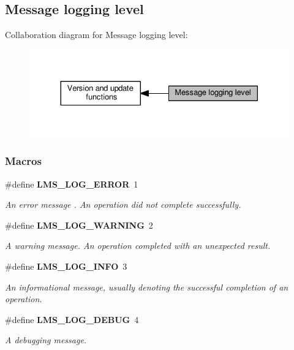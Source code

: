 \subsection{Message logging level}
\label{group__LMS__LOG__LEVEL}
Collaboration diagram for Message logging level\+:
\nopagebreak
\begin{figure}[H]
\begin{center}
\leavevmode
\includegraphics[width=330pt]{d2/d60/group__LMS__LOG__LEVEL}
\end{center}
\end{figure}
\subsubsection*{Macros}
\begin{DoxyCompactItemize}
\item 
\#define {\bf L\+M\+S\+\_\+\+L\+O\+G\+\_\+\+E\+R\+R\+OR}~1
\begin{DoxyCompactList}\small\item\em An error message . An operation did not complete successfully. \end{DoxyCompactList}\item 
\#define {\bf L\+M\+S\+\_\+\+L\+O\+G\+\_\+\+W\+A\+R\+N\+I\+NG}~2
\begin{DoxyCompactList}\small\item\em A warning message. An operation completed with an unexpected result. \end{DoxyCompactList}\item 
\#define {\bf L\+M\+S\+\_\+\+L\+O\+G\+\_\+\+I\+N\+FO}~3
\begin{DoxyCompactList}\small\item\em An informational message, usually denoting the successful completion of an operation. \end{DoxyCompactList}\item 
\#define {\bf L\+M\+S\+\_\+\+L\+O\+G\+\_\+\+D\+E\+B\+UG}~4
\begin{DoxyCompactList}\small\item\em A debugging message. \end{DoxyCompactList}\end{DoxyCompactItemize}


